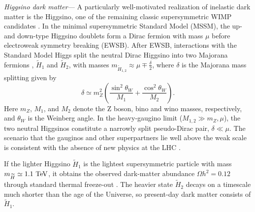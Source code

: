 \documentclass[
aps,
prl,
reprint,
superscriptaddress,
nofootinbib,
nobibnotes
]{revtex4-2}
\begin{document}

\textit{Higgsino dark matter---}
A particularly well-motivated realization of inelastic dark matter is the 
Higgsino, one of the remaining classic supersymmetric WIMP candidates
\cite{Krall:2017xij,Co:2021ion,Bhattiprolu:2025zwt,Kowalska:2018toh}.
In the minimal supersymmetric Standard Model (MSSM), the up- and down-type Higgsino doublets form a Dirac fermion with mass $\mu$ before electroweak symmetry breaking (EWSB). 
After EWSB, interactions with the Standard Model Higgs split the neutral Dirac Higgsino into two Majorana fermions \cite{Nagata:2014wma},
$\widetilde H_1$ and $\widetilde H_2$, with masses $m_{\widetilde H_{1,2}}\approx\mu \mp \frac{\delta}{2}$, where $\delta$ is the Majorana mass splitting given by
\begin{equation}
    \delta
    \simeq
    m_Z^2
    \left(
        \frac{\sin^2\theta_W}{M_1}
        +
        \frac{\cos^2\theta_W}{M_2}
    \right).
    \label{eq:higgsino_splitting}
\end{equation}
Here $m_Z$, $M_1$, and $M_2$ denote the Z boson, bino and wino masses, respectively, and $\theta_W$ is the Weinberg angle.
In the heavy-gaugino limit ($M_{1,2}\gg m_Z,\mu$), the two neutral Higgsinos constitute a narrowly split pseudo-Dirac pair, $\delta\ll\mu$.
The scenario that the gauginos and other superpartners lie well above the weak scale is consistent with the absence of new physics at the LHC 
\cite{Arkani-Hamed:2004ymt,Giudice:2004tc,Gonski:2025wzh}.

If the lighter Higgsino $\widetilde H_1$ is the lightest supersymmetric
particle \cite{Ellis:1983ew} with mass $m_{\widetilde H}\simeq 1.1~{\rm TeV}$, it obtains the observed dark-matter abundance $\Omega h^2=0.12$ through standard thermal freeze-out \cite{Kowalska:2018toh}. 
The heavier state $\widetilde H_2$ decays on a timescale much shorter than the age of the Universe, so present-day dark matter consists of $\widetilde H_1$.
\end{document}
